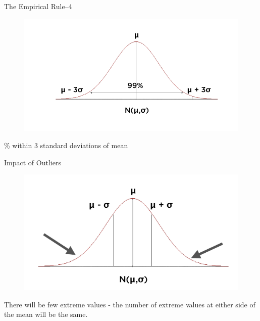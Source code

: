 \documentclass[10pt,dvipsnames, aspectratio=169]{beamer}
\begin{document}
\begin{frame}[t]{The Empirical Rule--4}
	
	\begin{figure} [ht]
		\centering
		\includegraphics[trim={0 1cm 0 0}, clip, scale=0.4]{eda/nd9.png}
	\end{figure}
	
	\% within 3 standard deviations of mean
	
\end{frame}

\begin{frame}[t]{Impact of Outliers}
	
	\begin{figure} [ht]
		\centering
		\includegraphics[trim={0 1cm 0 0}, clip, scale=0.4]{eda/nd6.png}
	\end{figure}
	
	\centering
	There will be few extreme values - the
	number of extreme values at either side of
	the mean will be the same.
\end{frame}
\end{document}
